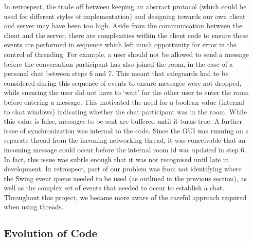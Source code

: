 In retrospect, the trade off between keeping an abstract protocol (which could be used for different styles of implementation) and designing towards our own client and server may have been too high. Aside from the communication between the client and the server, there are complexities within the client code to ensure these events are performed in sequence which left much opportunity for error in the control of threading. For example, a user should not be allowed to send a message before the conversation participant has also joined the room, in the case of a personal chat between steps 6 and 7. This meant that safeguards had to be considered during this sequence of events to ensure messages were not dropped, while ensuring the user did not have to `wait' for the other user to enter the room before entering a message. This motivated the need for a boolean value (internal to chat windows) indicating whether the chat participant was in the room. While this value is false, messages to be sent are buffered until it turns true. A further issue of synchronization was internal to the code. Since the GUI was running on a separate thread from the incoming networking thread, it was conceivable that an incoming message could occur before the internal room id was updated in step 6. In fact, this issue was subtle enough that it was not recognised until late in development. In retrospect, part of our problem was from not identifying where the Swing event queue needed to be used (as outlined in the previous section), as well as the complex set of events that needed to occur to establish a chat. Throughout this project, we became more aware of the careful approach required when using threads.

\subsection{Evolution of Code}


